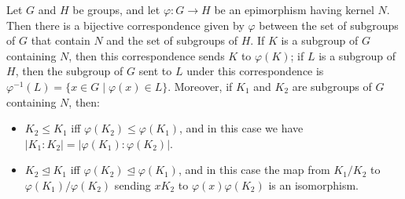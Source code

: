 \documentclass[../Odyssey_Project.tex]{subfiles}
\begin{document}
\begin{namedtheorem}
\label{thm:correspondence}
Let $G$ and $H$ be groups, and let $\varphi : G \to H$ be an epimorphism having kernel $N$. Then there is a bijective correspondence given by $\varphi$ between the set of subgroups of $G$ that contain $N$ and the set of subgroups of $H$. If $K$ is a subgroup of $G$ containing $N$, then this correspondence sends $K$ to $\varphi(K)$; if $L$ is a subgroup of $H$, then the subgroup of $G$ sent to $L$ under this correspondence is $\varphi^{-1}(L) = \{x \in G \mid \varphi(x) \in L\}$. Moreover, if $K_1$ and $K_2$ are subgroups of $G$ containing $N$, then:
\begin{itemize}
    \item $K_2 \leq K_1$ iff $\varphi(K_2) \leq \varphi(K_1)$, and in this case we have $|K_1 : K_2| = |\varphi(K_1) : \varphi(K_2)|$.
    \item $K_2 \trianglelefteq K_1$ iff $\varphi(K_2) \trianglelefteq \varphi(K_1)$, and in this case the map from $K_1/K_2$ to $\varphi(K_1)/\varphi(K_2)$ sending $xK_2$ to $\varphi(x)\varphi(K_2)$ is an isomorphism.
\end{itemize}
\end{namedtheorem}
\end{document}
